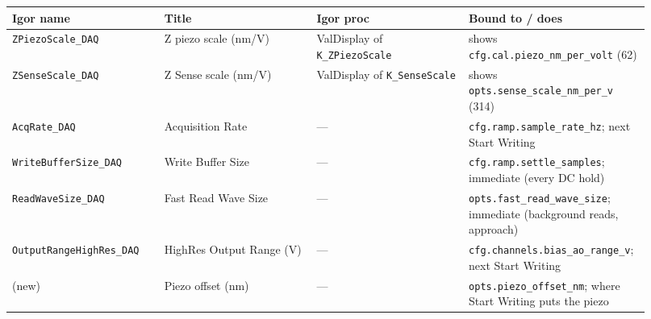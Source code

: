 \small\setlength{\LTleft}{0pt}\setlength{\LTright}{\fill}
\begin{longtable}{@{}>{\raggedright\arraybackslash}p{0.230\linewidth}>{\raggedright\arraybackslash}p{0.230\linewidth}>{\raggedright\arraybackslash}p{0.230\linewidth}>{\raggedright\arraybackslash}p{0.230\linewidth}@{}}
\toprule
\textbf{Igor name} & \textbf{Title} & \textbf{Igor proc} & \textbf{Bound to / does} \\
\midrule\endhead
\texttt{ZPiezo\discretionary{}{}{}Scale\_\discretionary{}{}{}DAQ} & Z piezo scale (nm/V) & ValDisplay of \texttt{K\_\discretionary{}{}{}ZPiezo\discretionary{}{}{}Scale} & shows \texttt{cfg.\discretionary{}{}{}cal.\discretionary{}{}{}piezo\_\discretionary{}{}{}nm\_\discretionary{}{}{}per\_\discretionary{}{}{}volt} (62) \\
\texttt{ZSense\discretionary{}{}{}Scale\_\discretionary{}{}{}DAQ} & Z Sense scale (nm/V) & ValDisplay of \texttt{K\_\discretionary{}{}{}Sense\discretionary{}{}{}Scale} & shows \texttt{opts.\discretionary{}{}{}sense\_\discretionary{}{}{}scale\_\discretionary{}{}{}nm\_\discretionary{}{}{}per\_\discretionary{}{}{}v} (314) \\
\texttt{Acq\discretionary{}{}{}Rate\_\discretionary{}{}{}DAQ} & Acquisition Rate & --- & \texttt{cfg.\discretionary{}{}{}ramp.\discretionary{}{}{}sample\_\discretionary{}{}{}rate\_\discretionary{}{}{}hz}; next Start Writing \\
\texttt{Write\discretionary{}{}{}Buffer\discretionary{}{}{}Size\_\discretionary{}{}{}DAQ} & Write Buffer Size & --- & \texttt{cfg.\discretionary{}{}{}ramp.\discretionary{}{}{}settle\_\discretionary{}{}{}samples}; immediate (every DC hold) \\
\texttt{Read\discretionary{}{}{}Wave\discretionary{}{}{}Size\_\discretionary{}{}{}DAQ} & Fast Read Wave Size & --- & \texttt{opts.\discretionary{}{}{}fast\_\discretionary{}{}{}read\_\discretionary{}{}{}wave\_\discretionary{}{}{}size}; immediate (background reads, approach) \\
\texttt{Output\discretionary{}{}{}Range\discretionary{}{}{}High\discretionary{}{}{}Res\_\discretionary{}{}{}DAQ} & HighRes Output Range (V) & --- & \texttt{cfg.\discretionary{}{}{}channels.\discretionary{}{}{}bias\_\discretionary{}{}{}ao\_\discretionary{}{}{}range\_\discretionary{}{}{}v}; next Start Writing \\
(new) & Piezo offset (nm) & --- & \texttt{opts.\discretionary{}{}{}piezo\_\discretionary{}{}{}offset\_\discretionary{}{}{}nm}; where Start Writing puts the piezo \\

\end{longtable}
